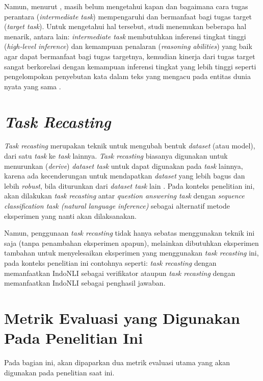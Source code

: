Namun, menurut \citet{pruksachatkun-etal-2020-intermediate}, masih belum mengetahui kapan dan bagaimana cara tugas perantara (\emph{intermediate task}) mempengaruhi dan bermanfaat bagi tugas target (\emph{target task}). Untuk mengetahui hal tersebut, studi \citet{pruksachatkun-etal-2020-intermediate} menemukan beberapa hal menarik, antara lain: \emph{intermediate task} membutuhkan inferensi tingkat tinggi (\emph{high-level inference}) dan kemampuan penalaran (\emph{reasoning abilities}) yang baik agar dapat bermanfaat bagi tugas targetnya, kemudian kinerja dari tugas target sangat berkorelasi dengan kemampuan inferensi tingkat yang lebih tinggi seperti pengelompokan penyebutan kata dalam teks yang mengacu pada entitas dunia nyata yang sama \citep{coference-resolution}.

\section{\emph{Task Recasting}}
\emph{Task recasting} merupakan teknik untuk mengubah bentuk \emph{dataset} (atau model), dari satu \emph{task} ke \emph{task} lainnya. \emph{Task recasting} biasanya digunakan untuk menurunkan (\emph{derive}) \emph{dataset task} untuk dapat digunakan pada \emph{task} lainnya, karena ada kecenderungan untuk mendapatkan \emph{dataset} yang lebih bagus dan lebih \emph{robust}, bila diturunkan dari \emph{dataset task} lain \citep{DBLP:journals/corr/abs-1809-02922}. Pada konteks penelitian ini, akan dilakukan \emph{task recasting} antar \emph{question answering task} dengan \emph{sequence classification task (natural language inference)} sebagai alternatif metode eksperimen yang nanti akan dilaksanakan. 

Namun, penggunaan \emph{task recasting} tidak hanya sebatas menggunakan teknik ini saja (tanpa penambahan eksperimen apapun), melainkan dibutuhkan eksperimen tambahan untuk menyelesaikan eksperimen yang menggunakan \emph{task recasting} ini, pada konteks penelitian ini contohnya seperti: \emph{task recasting} dengan memanfaatkan IndoNLI sebagai verifikator ataupun \emph{task recasting} dengan memanfaatkan IndoNLI sebagai penghasil jawaban.

\section{Metrik Evaluasi yang Digunakan Pada Penelitian Ini}
Pada bagian ini, akan dipaparkan dua metrik evaluasi utama yang akan digunakan
pada penelitian saat ini.

